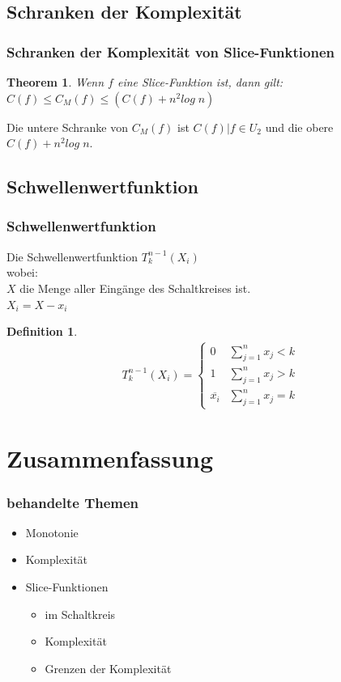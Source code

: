 \documentclass[hyperref={pdfpagelabels=false}]{beamer} %
\newtheorem{thm}{Theorem}
\newtheorem{defin}{Definition}
\begin{document}
  \subsection*{Schranken der Komplexität}
  \begin{frame}%
    \frametitle{Schranken der Komplexität von Slice-Funktionen}
    \begin{thm}
      Wenn $f$ eine Slice-Funktion ist, dann gilt:
      $C(f) \leq C_M(f) \leq (C(f) + n^2 log\;n)$%
    \end{thm}
    Die untere Schranke von $C_M(f)$ ist $C(f)|f \in U_2$ und die obere $C(f) + n^2 log\; n$.
  \end{frame}

  \subsection*{Schwellenwertfunktion}
  \begin{frame}%
     \frametitle{Schwellenwertfunktion}
     Die Schwellenwertfunktion $ T^{n-1}_k(X_i)$\\
     wobei: \\
     $X$ die Menge aller Eingänge des Schaltkreises ist.\\
     $X_i = X - x_i$ %
     \begin{defin}
       \begin{align*}
       T^{n-1}_k (X_i)=
       \begin{cases}
         0 & \sum\nolimits_{j=1}^{n} x_j < k\\
         1 & \sum\nolimits_{j=1}^{n} x_j > k\\
         \overline{x_i} & \sum\nolimits_{j=1}^{n} x_j = k
        \end{cases}
       \end{align*}
      \end{defin}
  \end{frame}

  \section{Zusammenfassung}
  \begin{frame}
    \frametitle{behandelte Themen}
    \begin{itemize}
      \item Monotonie
      \item Komplexität
      \item Slice-Funktionen
      \begin{itemize}
        \item im Schaltkreis
        \item Komplexität
        \item Grenzen der Komplexität
      \end{itemize}
    \end{itemize}
  \end{frame}
\end{document}
